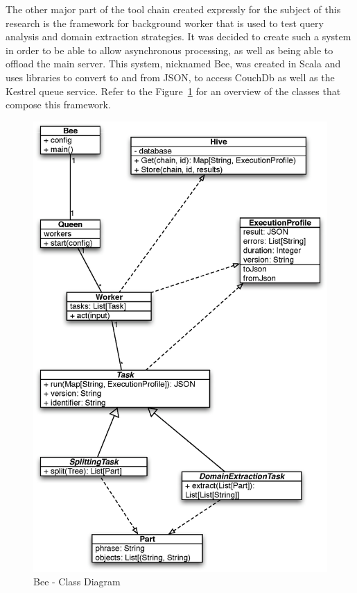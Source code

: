 The other major part of the tool chain created expressly for the subject of this research is the framework for background worker that is used to test query analysis and domain extraction strategies. It was decided to create such a system in order to be able to allow asynchronous processing, as well as being able to offload the main server. This system, nicknamed Bee, was created in Scala and uses libraries to convert to and from JSON, to access CouchDb as well as the Kestrel queue service. Refer to the Figure~\ref{fig:beeuml} for an overview of the classes that compose this framework.


\begin{figure}[ht!]
  \begin{center}
    \includegraphics[width=\linewidth]{images/beeuml}
  \end{center}
  \caption{Bee - Class Diagram}\label{fig:beeuml}
\end{figure}



